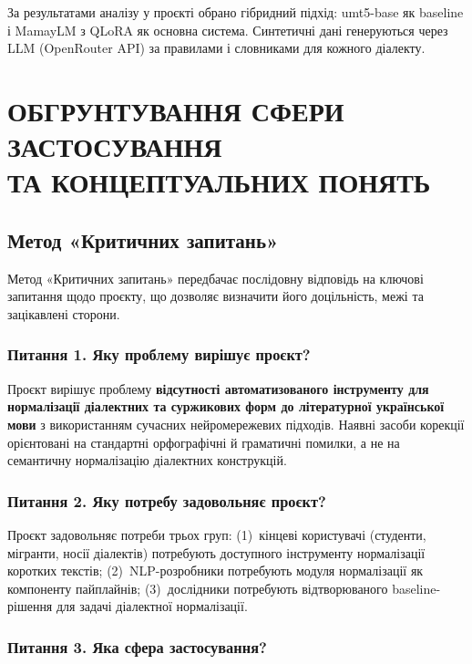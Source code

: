\documentclass[14pt]{extarticle}
\begin{document}
За результатами аналізу у проєкті обрано гібридний підхід: umt5-base як baseline і MamayLM з QLoRA як основна система. Синтетичні дані генеруються через LLM (OpenRouter API) за правилами і словниками для кожного діалекту.

\clearpage

\section{ОБГРУНТУВАННЯ СФЕРИ ЗАСТОСУВАННЯ\\ТА КОНЦЕПТУАЛЬНИХ ПОНЯТЬ}

\subsection{Метод «Критичних запитань»}

Метод «Критичних запитань» передбачає послідовну відповідь на ключові запитання щодо проєкту, що дозволяє визначити його доцільність, межі та зацікавлені сторони.

\subsubsection*{Питання 1. Яку проблему вирішує проєкт?}

Проєкт вирішує проблему \textbf{відсутності автоматизованого інструменту для нормалізації діалектних та суржикових форм до літературної української мови} з використанням сучасних нейромережевих підходів. Наявні засоби корекції орієнтовані на стандартні орфографічні й граматичні помилки, а не на семантичну нормалізацію діалектних конструкцій.

\subsubsection*{Питання 2. Яку потребу задовольняє проєкт?}

Проєкт задовольняє потреби трьох груп: (1)~кінцеві користувачі (студенти, мігранти, носії діалектів) потребують доступного інструменту нормалізації коротких текстів; (2)~NLP-розробники потребують модуля нормалізації як компоненту пайплайнів; (3)~дослідники потребують відтворюваного baseline-рішення для задачі діалектної нормалізації.

\subsubsection*{Питання 3. Яка сфера застосування?}
\end{document}
